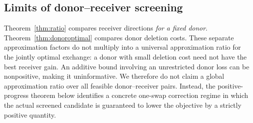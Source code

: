 \documentclass[review,10pt]{elsarticle}
\begin{document}
\subsection{Limits of donor--receiver screening}\label{subsec:pairquality}
Theorem~\ref{thm:ratio} compares receiver directions \emph{for a fixed donor}. Theorem~\ref{thm:donoroptimal} compares donor deletion costs. These separate approximation factors do not multiply into a universal approximation ratio for the jointly optimal exchange: a donor with small deletion cost need not have the best receiver gain. An additive bound involving an unrestricted donor loss can be nonpositive, making it uninformative. We therefore do not claim a global approximation ratio over all feasible donor--receiver pairs. Instead, the positive-progress theorem below identifies a concrete one-swap correction regime in which the actual screened candidate is guaranteed to lower the objective by a strictly positive quantity.
\end{document}
